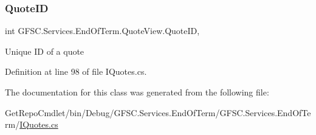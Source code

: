 \subsubsection{\texorpdfstring{Quote\+ID}{QuoteID}}
{\footnotesize\ttfamily int G\+F\+S\+C.\+Services.\+End\+Of\+Term.\+Quote\+View.\+Quote\+ID\hspace{0.3cm}{\ttfamily [get]}, {\ttfamily [set]}}



Unique ID of a quote 



Definition at line 98 of file I\+Quotes.\+cs.



The documentation for this class was generated from the following file\+:\begin{DoxyCompactItemize}
\item 
Get\+Repo\+Cmdlet/bin/\+Debug/\+G\+F\+S\+C.\+Services.\+End\+Of\+Term/\+G\+F\+S\+C.\+Services.\+End\+Of\+Term/\mbox{\hyperlink{_i_quotes_8cs}{I\+Quotes.\+cs}}\end{DoxyCompactItemize}
